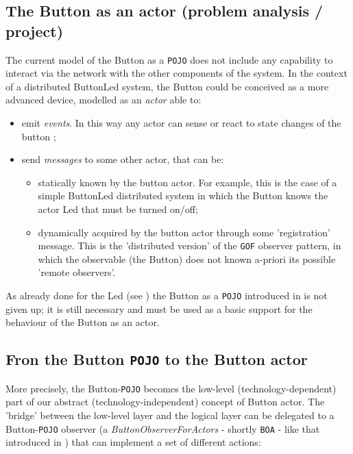 \subsection{The Button as an actor (problem analysis / project)}
The current model of the Button as a \texttt{POJO} does not include any capability to interact via the network  with the other components of the system.  
%
In the context of a distributed ButtonLed system, the Button could be conceived as a more advanced device, modelled as an \textit{actor} able to:
\begin{itemize}
\item emit \textit{events}. In this way any actor can sense or react to state changes of the button ;
\item send \textit{messages} to some other actor, that can be:
\begin{itemize}
\item statically known by the button actor. For example, this is the case of a simple ButtonLed distributed system in which the Button knows the actor Led that must be turned on/off;
\item dynamically acquired by the button actor through some 'registration' message. This is the 'distributed version' of the \texttt{GOF} observer pattern, in which the observable (the Button) does not known a-priori its possible 'remote observers'. 
\end{itemize}
\end{itemize}

As already done for the Led (see ) the Button as a \texttt{POJO} introduced in  is not given up; it is still necessary and must be used as a basic support for the behaviour of the Button as an actor. 

\subsection{Fron the Button \texttt{POJO} to the Button actor}

More precisely, the Button-\texttt{POJO} becomes the low-level (technology-dependent)  part of our abstract (technology-independent) concept of Button actor. The 'bridge' between the low-level layer and the logical layer can be delegated to a Button-\texttt{POJO} observer (a \textit{ButtonObserverForActors} - shortly \texttt{BOA} - like that introduced in  ) that can implement a set of different actions:

